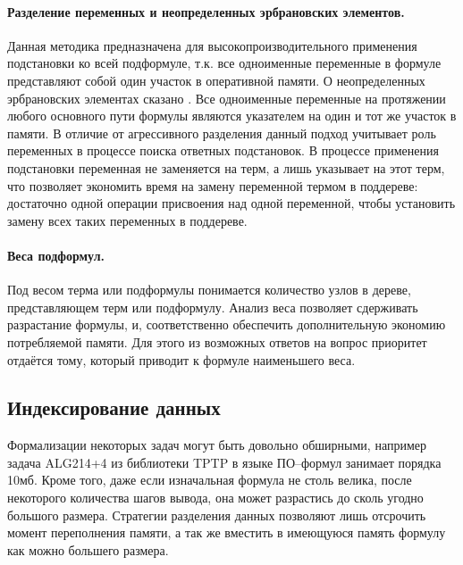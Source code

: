 \paragraph{Разделение переменных и неопределенных эрбрановских элементов.} Данная методика предназначена для высокопроизводительного применения подстановки ко всей подформуле, т.к. все одноименные переменные в формуле представляют собой один участок в оперативной памяти. О неопределенных эрбрановских элементах сказано . Все одноименные переменные на протяжении любого основного пути формулы \cite{dissChe} являются указателем на один и тот же участок в памяти. В отличие от агрессивного разделения данный подход учитывает роль переменных в процессе поиска ответных подстановок. В процессе применения подстановки переменная не заменяется на терм, а лишь указывает на этот терм, что позволяет экономить время на замену переменной термом в поддереве: достаточно одной операции присвоения над одной переменной, чтобы установить замену всех таких переменных в поддереве.

\paragraph{Веса подформул.} Под весом терма или подформулы понимается количество узлов в дереве, представляющем терм или подформулу. Анализ веса позволяет сдерживать разрастание формулы, и, соответственно обеспечить дополнительную экономию потребляемой памяти. Для этого из возможных ответов на вопрос приоритет отдаётся тому, который приводит к формуле наименьшего веса.


\subsection{Индексирование данных}

Формализации некоторых задач могут быть довольно обширными, например задача ALG214+4 из библиотеки TPTP в языке ПО--формул занимает порядка 10мб. Кроме того, даже если изначальная формула не столь велика, после некоторого количества шагов вывода, она может разрастись до сколь угодно большого размера. Стратегии разделения данных позволяют лишь отсрочить момент переполнения памяти, а так же вместить в имеющуюся память формулу как можно большего размера. 

